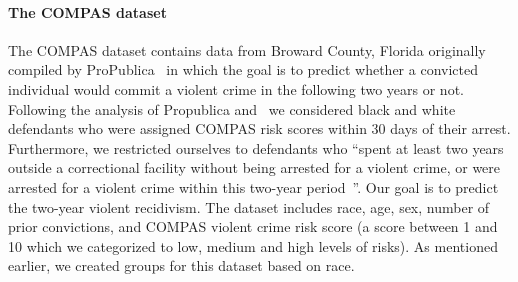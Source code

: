 
\paragraph{The COMPAS dataset}
The COMPAS dataset contains data from Broward County, Florida originally compiled
by ProPublica~\cite{propublica} in which the goal
is to predict whether a convicted individual would commit a violent crime in the following two years
or not.
Following the analysis of Propublica and~\citet{Corbett-DaviesP17} we considered black
and white defendants who were assigned COMPAS risk scores
within 30 days of their arrest. Furthermore, we restricted ourselves to defendants who
``spent at least two years outside
a correctional facility without being arrested for a violent crime,
or were arrested for a violent crime within this two-year period~\cite{Corbett-DaviesP17}''.
Our goal is to predict the two-year violent recidivism. 
The dataset includes race, age, sex, number of prior convictions, and COMPAS violent crime
risk score (a score between 1 and 10 which we categorized to low, medium and high levels of risks).
As mentioned earlier, we created groups for this dataset based on race.

